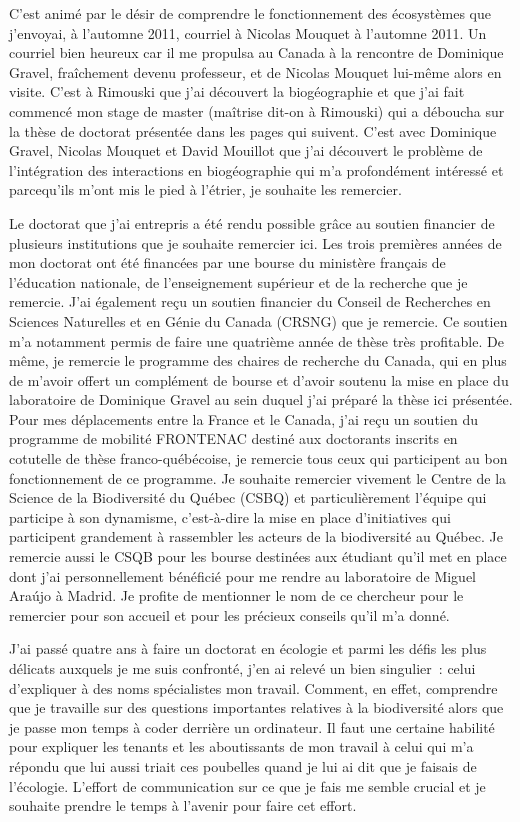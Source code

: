 C'est animé par le désir de comprendre le fonctionnement des écosystèmes
que j'envoyai, à l'automne 2011, courriel à Nicolas Mouquet à l'automne
2011. Un courriel bien heureux car il me propulsa au Canada à la
rencontre de Dominique Gravel, fraîchement devenu professeur, et de
Nicolas Mouquet lui-même alors en visite. C'est à Rimouski que j'ai
découvert la biogéographie et que j'ai fait commencé mon stage de master
(maîtrise dit-on à Rimouski) qui a déboucha sur la thèse de doctorat
présentée dans les pages qui suivent. C'est avec Dominique Gravel,
Nicolas Mouquet et David Mouillot que j'ai découvert le problème de
l'intégration des interactions en biogéographie qui m'a profondément
intéressé et parcequ'ils m'ont mis le pied à l'étrier, je souhaite les
remercier.

Le doctorat que j'ai entrepris a été rendu possible grâce au soutien
financier de plusieurs institutions que je souhaite remercier ici. Les
trois premières années de mon doctorat ont été financées par une bourse
du ministère français de l'éducation nationale, de l'enseignement
supérieur et de la recherche que je remercie. J'ai également reçu un
soutien financier du Conseil de Recherches en Sciences Naturelles et en
Génie du Canada (CRSNG) que je remercie. Ce soutien m'a notamment permis
de faire une quatrième année de thèse très profitable. De même, je
remercie le programme des chaires de recherche du Canada, qui en plus de
m'avoir offert un complément de bourse et d'avoir soutenu la mise en
place du laboratoire de Dominique Gravel au sein duquel j'ai préparé la
thèse ici présentée. Pour mes déplacements entre la France et le Canada,
j'ai reçu un soutien du programme de mobilité FRONTENAC destiné aux
doctorants inscrits en cotutelle de thèse franco-québécoise, je remercie
tous ceux qui participent au bon fonctionnement de ce programme. Je
souhaite remercier vivement le Centre de la Science de la Biodiversité
du Québec (CSBQ) et particulièrement l'équipe qui participe à son
dynamisme, c'est-à-dire la mise en place d'initiatives qui participent
grandement à rassembler les acteurs de la biodiversité au Québec. Je
remercie aussi le CSQB pour les bourse destinées aux étudiant qu'il met
en place dont j'ai personnellement bénéficié pour me rendre au
laboratoire de Miguel Araújo à Madrid. Je profite de mentionner le nom
de ce chercheur pour le remercier pour son accueil et pour les précieux
conseils qu'il m'a donné.

J'ai passé quatre ans à faire un doctorat en écologie et parmi les défis
les plus délicats auxquels je me suis confronté, j'en ai relevé un bien
singulier~: celui d'expliquer à des noms spécialistes mon travail.
Comment, en effet, comprendre que je travaille sur des questions
importantes relatives à la biodiversité alors que je passe mon temps à
coder derrière un ordinateur. Il faut une certaine habilité pour
expliquer les tenants et les aboutissants de mon travail à celui qui m'a
répondu que lui aussi triait ces poubelles quand je lui ai dit que je
faisais de l'écologie. L'effort de communication sur ce que je fais me
semble crucial et je souhaite prendre le temps à l'avenir pour faire cet
effort.

